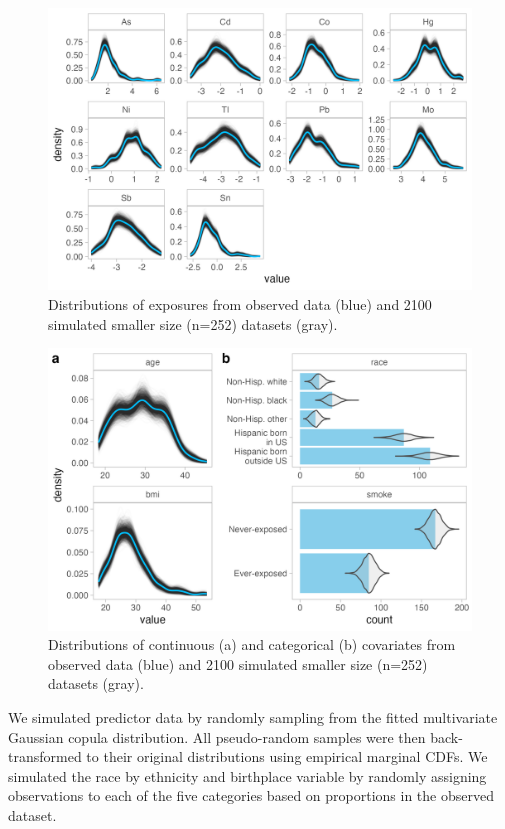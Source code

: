 \documentclass[12pt, twoside]{amherstthesis}
\begin{document}
\begin{figure}

{\centering \includegraphics[width=0.75\linewidth]{figures/ch4_univ_exp_sim} 

}

\caption{Distributions of exposures from observed data (blue) and 2100 simulated smaller size (n=252) datasets (gray).}\label{fig:univexpsim}
\end{figure}
\begin{figure}

{\centering \includegraphics[width=0.75\linewidth]{figures/ch4_univ_cov_sim} 

}

\caption{Distributions of continuous (a) and categorical (b) covariates from observed data (blue) and 2100 simulated smaller size (n=252) datasets (gray).}\label{fig:univcovsim}
\end{figure}
We simulated predictor data by randomly sampling from the fitted multivariate Gaussian copula distribution. All pseudo-random samples were then back-transformed to their original distributions using empirical marginal CDFs. We simulated the race by ethnicity and birthplace variable by randomly assigning observations to each of the five categories based on proportions in the observed dataset.
\end{document}
